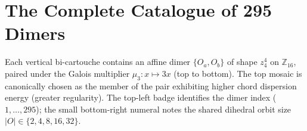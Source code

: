 \section{The Complete Catalogue of 295 Dimers}
\label{sec:dimers-catalogue}

Each vertical bi-cartouche contains an affine dimer $\{O_a, O_b\}$ of shape $z_4^4$ on $\mathbb{Z}_{16}$, paired under the Galois multiplier $\mu_3 \colon x \mapsto 3x$ (top to bottom). The top mosaic is canonically chosen as the member of the pair exhibiting higher chord dispersion energy (greater regularity). The top-left badge identifies the dimer index ($1, \dots, 295$); the small bottom-right numeral notes the shared dihedral orbit size $|O| \in \{2, 4, 8, 16, 32\}$.

\clearpage

